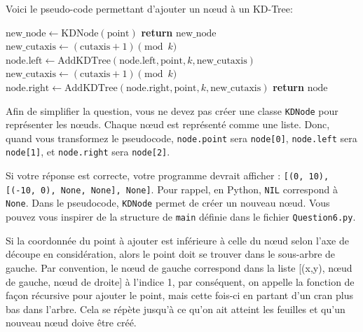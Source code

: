 \begin{Exercice}[15 minutes]
Voici le pseudo-code permettant d'ajouter un nœud à un KD-Tree:
    \begin{algorithm}[H]
        \caption{AddKDTree($\text{node}, \text{point}, k, \text{cutaxis}$)}
    \begin{algorithmic}[1]
        \State $\text{new\_node} \leftarrow \text{KDNode}(\text{point})$    \State \textbf{return} $\text{new\_node}$
    \EndIf
     
        \State $\text{new\_cutaxis} \leftarrow (\text{cutaxis} + 1) \pmod k$
        \State $\text{node}.\text{left} \leftarrow \text{AddKDTree}(\text{node}.\text{left}, \text{point}, k, \text{new\_cutaxis})$
    \Else
        \State $\text{new\_cutaxis} \leftarrow (\text{cutaxis} + 1) \pmod k$
        \State $\text{node}.\text{right} \leftarrow \text{AddKDTree}(\text{node}.\text{right}, \text{point}, k, \text{new\_cutaxis})$
    \EndIf
    \State \textbf{return} $\text{node}$
    \end{algorithmic}
    \end{algorithm}
\begin{attention}
Afin de simplifier la question, vous ne devez pas créer une classe \texttt{KDNode} pour représenter les nœuds. Chaque nœud est représenté comme une liste. Donc, quand vous transformez le pseudocode, \texttt{node.point} sera \texttt{node[0]}, \texttt{node.left} sera \texttt{node[1]}, et \texttt{node.right} sera \texttt{node[2]}.
\end{attention}
\begin{conseil}    
    Si votre réponse est correcte, votre programme devrait afficher : \lstinline{[(0, 10), [(-10, 0), None, None], None]}. Pour rappel, en Python, \lstinline{NIL} correspond à \lstinline{None}. Dans le pseudocode, \lstinline{KDNode} permet de créer un nouveau nœud. Vous pouvez vous inspirer de la structure de \lstinline{main} définie dans le fichier \lstinline{Question6.py}.
\end{conseil}

\begin{solution}

\end{solution}
\begin{solution}

\end{solution}
\begin{solution}
Si la coordonnée du point à ajouter est inférieure à celle du nœud selon l'axe de découpe en considération, alors le point doit se trouver dans le sous-arbre de gauche. Par convention, le nœud de gauche correspond dans la liste [(x,y), nœud de gauche, nœud de droite] à l'indice 1, par conséquent, on appelle la fonction de façon récursive pour ajouter le point, mais cette fois-ci en partant d'un cran plus bas dans l'arbre. Cela se répète jusqu'à ce qu'on ait atteint les feuilles et qu'un nouveau nœud doive être créé.
\end{solution}
\end{Exercice}

